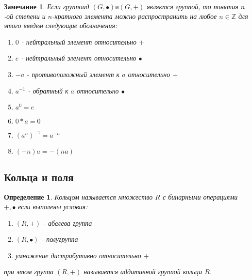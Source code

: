 \documentclass[12pt,oneside]{article}
\newtheorem{determ}[theorem]{Определение}
\newtheorem{ffff}[theorem]{Замечание}
\theoremstyle{definition}
\newcommand{\ZZ}{\mathbb{Z}}
\begin{document}
\begin{ffff}
	Если группоид $(G,\bullet) и (G,+)$ являктся группой, то понятия $n$-ой степени и $n$-кратного элемента можно распространить на любое $n\in \ZZ$ для этого введем следующие обозначения:
	\begin{enumerate}
		\item $0$ - нейтральный элемент относительно $+$
		\item $e$ - нейтральный элемент относительно $\bullet$
		\item $-a$ - противоположный элемент к $a$ относительно $+$
		\item $a^{-1}$ - обратный к $a$ относительно $\bullet$
		\item $a^0=e$
		\item $0*a=0$
		\item $(a^n)^{-1}=a^{-n}$
		\item $(-n)a=-(na)$
	\end{enumerate}
\end{ffff}













































\subsection{Кольца и поля}
\begin{determ}
	Кольцом называется множество $R$ с бинарными операциями $ +, \bullet $ если выполены условия:
	\begin{enumerate}
		\item $ (R,+) $ - абелева группа 
		\item $ (R,\bullet) $ - полугруппа
		\item умножение дистрибутивно относительно $+$
	\end{enumerate}
	при этом группа $(R,+)$ называется аддитивной группой кольца $R$.
\end{determ}
\end{document}
